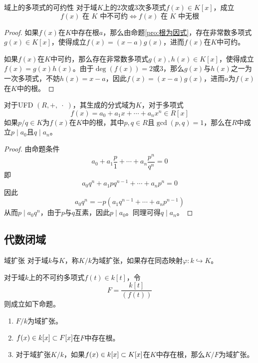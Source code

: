 \begin{proposition}{}{域上的多项式的可约性}
	对于域$K$上的$2$次或$3$次多项式$f(x)\in K[x]$，成立%
	$$
	f(x)\text{ 在 }K\text{ 中不可约}
	\iff
	f(x)\text{ 在 }K\text{ 中无根}
	$$
\end{proposition}

\begin{proof}
	如果$f(x)$在$K$中存在根$a$，那么由命题\ref{pro:根为因式}，存在非常数多项式$g(x)\in K[x]$，使得成立$f(x)=(x-a)g(x)$，进而$f(x)$在$K$中可约。
	
	如果$f(x)$在$K$中可约，那么存在非常数多项式$g(x),h(x)\in K[x]$，使得成立$f(x)=g(x)h(x)$。由于$\deg(f(x))=2$或$3$，那么$g(x)$与$h(x)$之一为一次多项式，不妨$h(x)=x-a$，因此$f(x)=(x-a)g(x)$，进而$a$为$f(x)$在$K$中的根。
\end{proof}

\begin{proposition}
	对于UFD $(R,+,\;\cdot \;)$，其生成的分式域为$K$，对于多项式
	$$
	f(x)=a_0+a_1x+\cdots+a_nx^n\in R[x]
	$$
	如果$p/q\in K$为$f(x)$在$K$中的根，其中$p,q\in R$且$\gcd(p,q)=1$，那么在$R$中成立$p\mid a_0$且$q\mid a_n$。
\end{proposition}

\begin{proof}
	由命题条件%
	$$
	a_0+a_1\frac{p}{1}+\cdots+a_n\frac{p^n}{q^n}=0
	$$
	即%
	$$
	a_0q^n+a_1pq^{n-1}+\cdots+a_np^n=0
	$$
	因此%
	$$
	a_0q^n=-p(a_1q^{n-1}+\cdots+a_np^{n-1})
	$$
	从而$p\mid a_0q^n$，由于$p$与$q$互素，因此$p\mid a_0$。同理可得$q\mid a_n$。
\end{proof}

\subsection{代数闭域}

\begin{definition}{域扩张}
	对于域$k$与$K$，称$K/k$为域扩张，如果存在同态映射$\varphi:k\hookrightarrow K$。
\end{definition}

\begin{proposition}
	对于域$k$上的不可约多项式$f(t)\in k[t]$，令%
	$$
	F=\frac{k[t]}{(f(t))}
	$$
	则成立如下命题。
	\begin{enumerate}
		\item $F/k$为域扩张。
		\item $f(x)\in k[x]\subset F[x]$在$F$中存在根。
		\item 对于域扩张$K/k$，如果$f(x)\in k[x]\subset K[x]$在$K$中存在根，那么$K/F$为域扩张。
	\end{enumerate}
\end{proposition}

